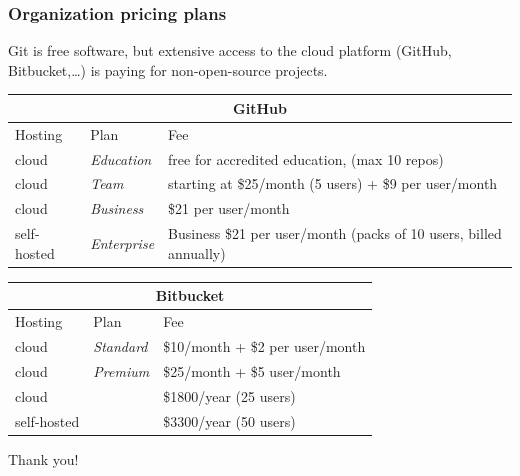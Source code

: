 \documentclass[10pt,svgnames,handout]{beamer}
\begin{document}
\begin{frame}
\frametitle{Organization pricing plans}

Git is free software, but extensive access to the cloud platform (GitHub, Bitbucket,\ldots) is paying for non-open-source projects.

\small

\begin{tabular}{lll}
\multicolumn{3}{c}{\textbf{GitHub}}\\
\toprule
Hosting     & Plan              & Fee                                                               \\
\midrule
cloud & \emph{Education}  & free for accredited education, (max 10 repos)                     \\
cloud & \emph{Team}       & starting at  \$25/month (5 users) + \$9 per user/month            \\
cloud & \emph{Business}   & \$21 per user/month                                               \\
\midrule
self-hosted & \emph{Enterprise} & Business \$21 per user/month (packs of 10 users, billed annually) \\
\bottomrule
\end{tabular}

\medskip

\begin{tabular}{lll}
\multicolumn{3}{c}{\textbf{Bitbucket}}\\
\toprule
Hosting     & Plan                   &  Fee                             \\
\midrule
cloud       & \emph{Standard}        &  \$10/month + \$2 per user/month \\
cloud       & \emph{Premium}         &  \$25/month + \$5 user/month     \\
cloud       &                        &  \$1800/year (25 users)          \\
\midrule
self-hosted &                        & \$3300/year (50 users) \\
\bottomrule
\end{tabular}
\end{frame}


\begin{frame}[standout]
Thank you!
\end{frame}


\appendix
\end{document}
